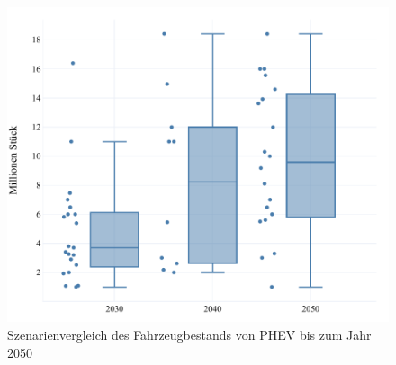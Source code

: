\begin{figure}[H]
    \centering
    \includegraphics[width=\textwidth]{Bilder/RampUp-PHEV-MA}
    \caption{Szenarienvergleich des Fahrzeugbestands von PHEV bis zum Jahr \num{2050}}\label{fig:RampUpPHEV}
\end{figure}